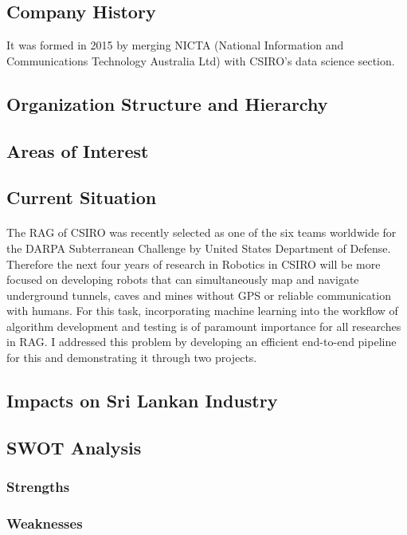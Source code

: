\subsection{Company History}

It was formed in 2015 by merging NICTA (National Information and Communications Technology Australia Ltd) with CSIRO's data science section. 

\subsection{Organization Structure and Hierarchy}
\subsection{Areas of Interest}
\subsection{Current Situation}

\paragraph{}
The RAG of CSIRO was recently selected as one of the six teams worldwide for the DARPA Subterranean Challenge by United States Department of Defense. Therefore the next four years of research in Robotics in CSIRO will be more focused on developing robots that can simultaneously map and navigate underground tunnels, caves and mines without GPS or reliable communication with humans. For this task, incorporating machine learning into the workflow of algorithm development and testing is of paramount importance for all researches in RAG. I addressed this problem by developing an efficient end-to-end pipeline for this and demonstrating it through two projects.

\subsection{Impacts on Sri Lankan Industry}

\subsection{SWOT Analysis}
\subsubsection{Strengths}
\subsubsection{Weaknesses}
